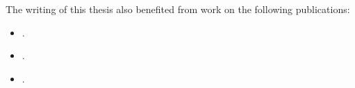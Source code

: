 
\noindent%
The writing of this thesis also benefited from work on the following publications:

\begin{itemize}
\item {}.
\item {}.
\item {}. 
\end{itemize}
